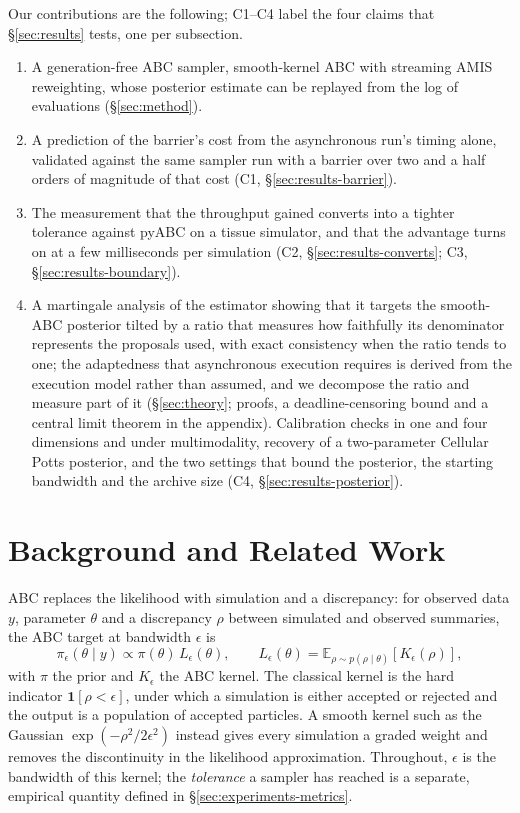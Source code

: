 \documentclass[10pt]{article}
\theoremstyle{plain}
\theoremstyle{definition}
\begin{document}
Our contributions are the following; C1--C4 label the four claims that \S\ref{sec:results} tests, one per subsection.
\begin{enumerate}
\item A generation-free ABC sampler, smooth-kernel ABC with streaming AMIS reweighting, whose posterior estimate can be replayed from the log of evaluations (\S\ref{sec:method}).
\item A prediction of the barrier's cost from the asynchronous run's timing alone, validated against the same sampler run with a barrier over two and a half orders of magnitude of that cost (C1, \S\ref{sec:results-barrier}).
\item The measurement that the throughput gained converts into a tighter tolerance against pyABC on a tissue simulator, and that the advantage turns on at a few milliseconds per simulation (C2, \S\ref{sec:results-converts}; C3, \S\ref{sec:results-boundary}).
\item A martingale analysis of the estimator showing that it targets the smooth-ABC posterior tilted by a ratio that measures how faithfully its denominator represents the proposals used, with exact consistency when the ratio tends to one; the adaptedness that asynchronous execution requires is derived from the execution model rather than assumed, and we decompose the ratio and measure part of it (\S\ref{sec:theory}; proofs, a deadline-censoring bound and a central limit theorem in the appendix). Calibration checks in one and four dimensions and under multimodality, recovery of a two-parameter Cellular Potts posterior, and the two settings that bound the posterior, the starting bandwidth and the archive size (C4, \S\ref{sec:results-posterior}).
\end{enumerate}

\section{Background and Related Work}\label{sec:background}\label{sec:background-abc}\label{sec:background-sequential}\label{sec:background-amis}\label{sec:background-distributed}
ABC replaces the likelihood with simulation and a discrepancy: for observed data $y$, parameter $\theta$ and a discrepancy $\rho$ between simulated and observed summaries, the ABC target at bandwidth $\epsilon$ is
\begin{equation}
\pi_{\epsilon}(\theta \mid y) \propto \pi(\theta)\, L_{\epsilon}(\theta),
\qquad
L_{\epsilon}(\theta) = \mathbb{E}_{\rho \sim p(\rho \mid \theta)}\!\left[K_{\epsilon}(\rho)\right],
\label{eq:abc-target}
\end{equation}
with $\pi$ the prior and $K_\epsilon$ the ABC kernel. The classical kernel is the hard indicator $\mathbf{1}[\rho<\epsilon]$, under which a simulation is either accepted or rejected and the output is a population of accepted particles. A smooth kernel such as the Gaussian $\exp(-\rho^2/2\epsilon^2)$ \citep{wilkinson2013,fearnhead2012} instead gives every simulation a graded weight and removes the discontinuity in the likelihood approximation. Throughout, $\epsilon$ is the bandwidth of this kernel; the \emph{tolerance} a sampler has reached is a separate, empirical quantity defined in \S\ref{sec:experiments-metrics}.
\end{document}
